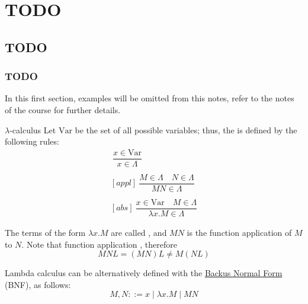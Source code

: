 \documentclass[a4paper, 12pt]{report}
\institute{\curlyquotes{\hspace{0.25mm}Sapienza} Università di Roma}
\subtitle{Appunti integrati con il libro \book}
\author{\textit{Autore}\\\authorName}
\institute{\curlyquotes{\hspace{0.25mm}Sapienza} University of Rome}
\subtitle{Lecture notes integrated with the book \book}
\author{\textit{Author}\\\authorName}
\title{\courseName}
\date{\today}
\begin{document}
    \maketitle

    {
        \hypersetup{allcolors=black}

        \romantableofcontents
    }

    \introduction


    \chapter{TODO}

    \section{TODO}

    \subsection{TODO}
 
    In this first section, examples will be omitted from this notes, refer to the notes of the  course for further details. 

    \begin{frameddefn}[breakable]{$\lambda$-calculus}
        Let $\mathrm{Var}$ be the set of all possible variables; thus, the  is defined by the following rules:
        \begin{gather*}
            [var] \ \dfrac{x \in \mathrm{Var}}{x \in \Lambda} \\ \\
            [appl] \ \dfrac{M \in \Lambda \quad N \in \Lambda}{M N \in \Lambda} \\ \\
            [abs] \ \dfrac{x \in \mathrm{Var} \quad M \in \Lambda}{\lambda x.M \in \Lambda}
        \end{gather*}

        The terms of the form $\lambda x.M$ are called , and $MN$ is the function application of $M$ to $N$. Note that function application , therefore $$MNL = (MN)L \neq M(NL)$$

        Lambda calculus can be alternatively defined with the \href{https://en.wikipedia.org/wiki/Backus%E2%80%93Naur_form}{Backus Normal Form} (BNF), as follows: $$M, N ::= x \mid \lambda x.M \mid M N$$
    \end{frameddefn}
\end{document}
